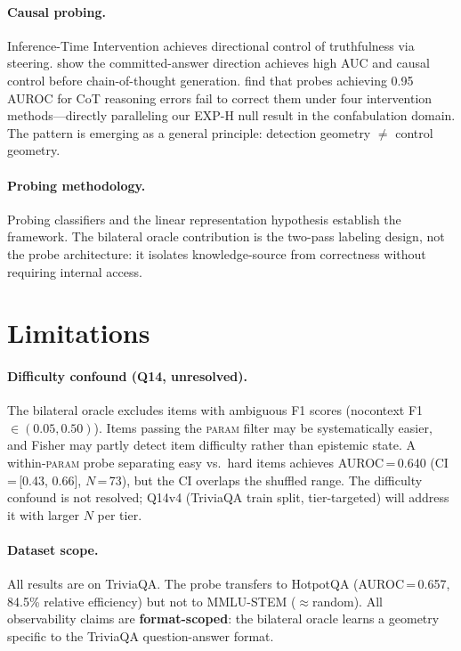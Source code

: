 \documentclass[11pt,twocolumn]{article}
\begin{document}
\paragraph{Causal probing.}
Inference-Time Intervention \citep{li2023iti} achieves directional control of
truthfulness via steering. \citet{cox2026decoding} show the committed-answer direction
achieves high AUC and causal control before chain-of-thought generation.
\citet{hiddenerror2026} find that probes achieving 0.95 AUROC for CoT reasoning errors
fail to correct them under four intervention methods---directly paralleling our EXP-H
null result in the confabulation domain. The pattern is emerging as a general principle:
detection geometry $\neq$ control geometry.

\paragraph{Probing methodology.}
Probing classifiers \citep{alain2016probing} and the linear representation hypothesis
\citep{elhage2022solu} establish the framework. The bilateral oracle contribution is the
two-pass labeling design, not the probe architecture: it isolates knowledge-source from
correctness without requiring internal access.

\section{Limitations}

\paragraph{Difficulty confound (Q14, unresolved).}
The bilateral oracle excludes items with ambiguous F1 scores (nocontext F1
$\in (0.05, 0.50)$). Items passing the \textsc{param} filter may be
systematically easier, and Fisher may partly detect item difficulty rather than
epistemic state. A within-\textsc{param} probe separating easy vs.\ hard items
achieves AUROC\,=\,0.640 (CI\,=\,[0.43, 0.66], $N$\,=\,73), but the CI overlaps
the shuffled range. The difficulty confound is not resolved; Q14v4 (TriviaQA train
split, tier-targeted) will address it with larger $N$ per tier.

\paragraph{Dataset scope.}
All results are on TriviaQA. The probe transfers to HotpotQA (AUROC\,=\,0.657,
84.5\% relative efficiency) but not to MMLU-STEM ($\approx$random). All
observability claims are \textbf{format-scoped}: the bilateral oracle learns a
geometry specific to the TriviaQA question-answer format.
\end{document}
